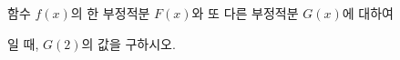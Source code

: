 함수 $f(x)$의 한 부정적분 $F(x)$와 또 다른 부정적분 $G(x)$에 대하여 \par\smallskip{}\par\smallskip\noindent 일 때, $G(2)$의 값을 구하시오.
